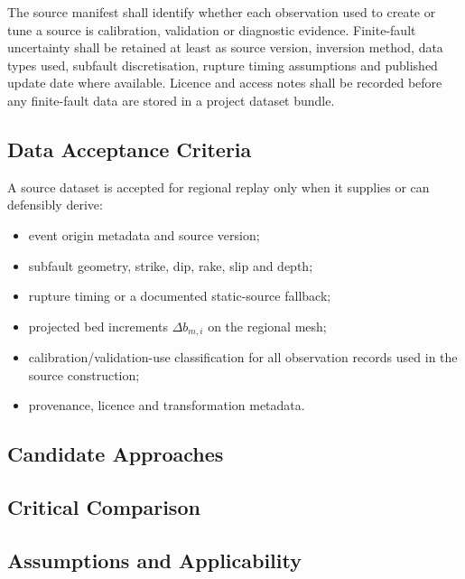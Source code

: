 The source manifest shall identify whether each observation used to
create or tune a source is calibration, validation or diagnostic
evidence. Finite-fault uncertainty shall be retained at least as source
version, inversion method, data types used, subfault discretisation,
rupture timing assumptions and published update date where available.
Licence and access notes shall be recorded before any finite-fault data
are stored in a project dataset bundle.

\subsection{Data Acceptance Criteria}
\label{sec:res-dat-src-data-acceptance-criteria}

A source dataset is accepted for regional replay only when it supplies
or can defensibly derive:

\begin{itemize}
  \item event origin metadata and source version;
  \item subfault geometry, strike, dip, rake, slip and depth;
  \item rupture timing or a documented static-source fallback;
  \item projected bed increments $\Delta b_{m,i}$ on the regional
    mesh;
  \item calibration/validation-use classification for all observation
    records used in the source construction;
  \item provenance, licence and transformation metadata.
\end{itemize}

\subsection{Candidate Approaches}
\label{sec:res-dat-src-candidate-approaches}


\subsection{Critical Comparison}
\label{sec:res-dat-src-critical-comparison}


\subsection{Assumptions and Applicability}
\label{sec:res-dat-src-assumptions}


